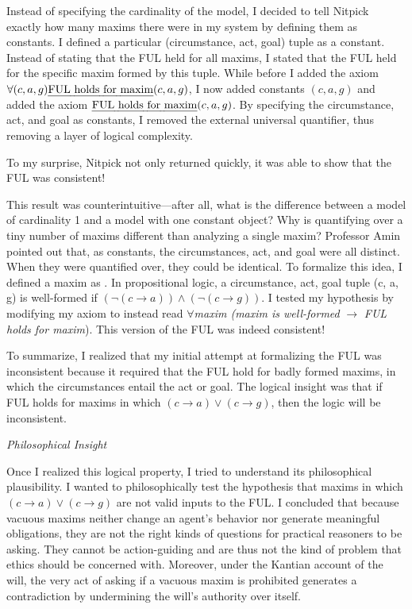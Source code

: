 \begin{isabellebody}
\begin{isamarkuptext}
Instead of specifying the cardinality of the model, I decided to tell Nitpick exactly how many 
maxims there were in my system by defining them as constants. I defined a particular 
(circumstance, act, goal) tuple as a constant. Instead of
stating that the FUL held for all maxims, I stated that the FUL held for the specific maxim formed by this tuple.
While before I added the axiom $\forall (c, a, g) \text{\emph{FUL holds for maxim}} (c, a, g)$, I now added constants $(c, a, g)$ 
and added the axiom $\text{\emph{FUL holds for maxim}} (c, a, g)$. By specifying the circumstance, act, and goal 
as constants, I removed the external universal quantifier, thus removing a layer of logical complexity.

To my surprise, Nitpick not only returned quickly, it was able to show that the FUL was consistent!

This result was counterintuitive—after all, what is the difference between a model of cardinality 
1 and a model with one constant object? Why is quantifying over a tiny number of maxims different
 than analyzing a single maxim? Professor Amin pointed out that, as constants, the 
circumstances, act, and goal were all distinct. When they were quantified over, 
they could be identical. To formalize this idea, I defined a maxim as . In propositional 
logic, a circumstance, act, goal tuple (c, a, g) is well-formed if $(\neg (c \longrightarrow a) ) \wedge 
(\neg(c \longrightarrow g))$. I tested my hypothesis by modifying my axiom to instead read $\forall$\emph{maxim
(maxim is well-formed} $\longrightarrow$ \emph{FUL holds for maxim}). This version of the FUL was indeed consistent!

To summarize, I realized that my initial attempt at formalizing the FUL was inconsistent because 
it required that the FUL hold for badly formed maxims, in which the circumstances entail the act or 
goal. The logical insight was that if FUL holds for maxims in which $(c \longrightarrow a) \vee 
(c \longrightarrow g)$, then the logic will be inconsistent.

\emph{Philosophical Insight}

Once I realized this logical property, I tried to understand its philosophical plausibility. I 
wanted to philosophically test the hypothesis that maxims in which  $(c \longrightarrow a) \vee 
(c \longrightarrow g)$ are not valid inputs to the FUL. I concluded that because vacuous maxims neither 
change an agent's behavior nor generate meaningful obligations, they are not the right kinds of questions 
for practical reasoners to be asking. They cannot be action-guiding and are thus not the kind of problem that 
ethics should be concerned with. Moreover, under the Kantian account of the will, the very act of asking 
if a vacuous maxim is prohibited generates a contradiction by undermining the will's authority over itself. 


\end{isamarkuptext}
\end{isabellebody}
